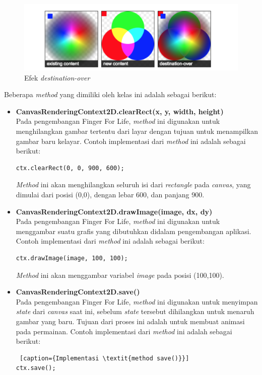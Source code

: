 \begin{enumerate}
\begin{enumerate}
\begin{itemize}
\begin{itemize}
\begin{figure}[H]
	\centering
	\includegraphics[scale=0.45]{Gambar/canvas_destination}
	\caption{Efek \textit{destination-over}}
	\label{fig:canvas_destination}
\end{figure}
			\end{itemize}
		\end{itemize}
		
		Beberapa \textit{method} yang dimiliki oleh kelas ini adalah sebagai berikut:
		\begin{itemize}
			\item \textbf{CanvasRenderingContext2D.clearRect(x, y, width, height)} \\
			Pada pengembangan Finger For Life, \textit{method} ini digunakan untuk menghilangkan gambar tertentu dari layar dengan tujuan untuk menampilkan gambar baru kelayar. Contoh implementasi dari \textit{method} ini adalah sebagai berikut:
\begin{lstlisting}[caption={Implementasi \textit{method clearRect()}}]
ctx.clearRect(0, 0, 900, 600);
\end{lstlisting}
\textit{Method} ini akan menghilangkan seluruh isi dari \textit{rectangle} pada \textit{canvas}, yang dimulai dari posisi (0,0), dengan lebar 600, dan panjang 900.			
			
			\item \textbf{CanvasRenderingContext2D.drawImage(image, dx, dy)} \\
			Pada pengembangan Finger For Life, \textit{method} ini digunakan untuk menggambar suatu grafis yang dibutuhkan didalam pengembangan aplikasi. Contoh implementasi dari \textit{method} ini adalah sebagai berikut:
\begin{lstlisting}[caption={Implementasi \textit{method drawImage()}}]
ctx.drawImage(image, 100, 100);
\end{lstlisting}
\textit{Method} ini akan menggambar variabel \textit{image} pada posisi (100,100).

			\item \textbf{CanvasRenderingContext2D.save()} \\
			Pada pengembangan Finger For Life, \textit{method} ini digunakan untuk menyimpan \textit{state} dari \textit{canvas} saat ini, sebelum \textit{state} tersebut dihilangkan untuk menaruh gambar yang baru. Tujuan dari proses ini adalah untuk membuat animasi pada permainan. Contoh implementasi dari \textit{method} ini adalah sebagai berikut:
\begin{lstlisting} [caption={Implementasi \textit{method save()}}]
ctx.save();
\end{lstlisting}	


\end{itemize}
\end{enumerate}
\end{enumerate}
